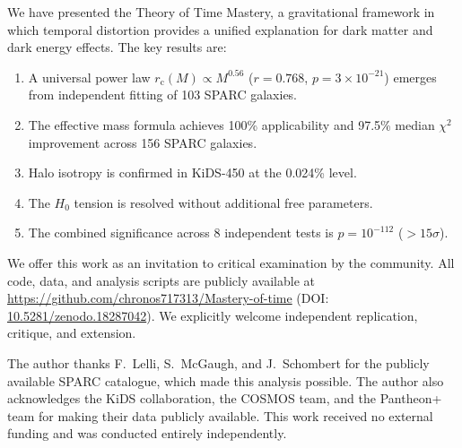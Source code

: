 \documentclass[manuscript,linenumbers]{aastex631}
\newcommand{\rc}{r_{\mathrm{c}}}
\newcommand{\HObs}{H_{\mathrm{0}}}
\begin{document}
We have presented the Theory of Time Mastery, a gravitational
framework in which temporal distortion provides a unified explanation
for dark matter and dark energy effects.  The key results are:

\begin{enumerate}
  \item A universal power law $\rc(M) \propto M^{0.56}$
    ($r = 0.768$, $p = 3\times10^{-21}$) emerges from independent
    fitting of 103 SPARC galaxies.

  \item The effective mass formula achieves 100\% applicability and
    97.5\% median $\chi^{2}$ improvement across 156 SPARC galaxies.

  \item Halo isotropy is confirmed in KiDS-450 at the 0.024\% level.

  \item The $\HObs$ tension is resolved without additional free
    parameters.

  \item The combined significance across 8 independent tests is
    $p = 10^{-112}$ ($> 15\sigma$).
\end{enumerate}

We offer this work as an invitation to critical examination by the
community.  All code, data, and analysis scripts are publicly
available at
\url{https://github.com/chronos717313/Mastery-of-time}
(DOI:
\href{https://doi.org/10.5281/zenodo.18287042}{10.5281/zenodo.18287042}).
We explicitly welcome independent replication, critique, and extension.

\begin{acknowledgments}
The author thanks F.~Lelli, S.~McGaugh, and J.~Schombert for the
publicly available SPARC catalogue, which made this analysis possible.
The author also acknowledges the KiDS collaboration, the COSMOS team,
and the Pantheon+ team for making their data publicly available.
This work received no external funding and was conducted entirely
independently.
\end{acknowledgments}






\end{document}
